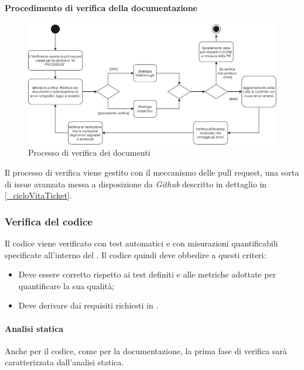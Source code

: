 \paragraph{Procedimento di verifica della documentazione}
\begin{figure}[h!]
    \includegraphics[width=\linewidth]{res/images/processo_verifica.png}
    \caption{Processo di verifica  dei documenti}
\end{figure}
Il processo di verifica viene gestito con il meccanismo delle pull request, una sorta di issue avanzata messa a disposizione da \textit{Github} descritto in dettaglio in \ref{_cicloVitaTicket}.

\subsubsection{Verifica del codice}
Il codice viene verificato con test automatici e con misurazioni quantificabili specificate all'interno del . Il codice quindi deve obbedire a questi criteri:
\begin{itemize}
    \item Deve essere corretto rispetto ai test definiti e alle metriche adottate per quantificare la sua qualità;
    \item Deve derivare dai requisiti richiesti in .
\end{itemize}

\paragraph{Analisi statica}
Anche per il codice, come per la documentazione, la prima fase di verifica sarà caratterizzata dall'analisi statica. %

